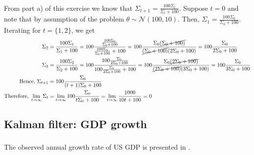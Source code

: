 \documentclass[]{article}
\begin{document}
\subsubsection{}\label{1.3}

From part a) of this exercise we know that $\Sigma_{t+1} = \frac{100\Sigma_t}{\Sigma_t + 100}$. Suppose $t = 0$ and note that by assumption of the problem $\theta\sim\mathcal{N}(100, 10)$. Then, $\Sigma_{1} = \frac{100\Sigma_0}{\Sigma_0 + 100}$. Iterating for $t=\{1, 2\}$, we get
\begin{equation}
\begin{split}
	\Sigma_{2}& = \frac{100\Sigma_1}{\Sigma_1 + 100} = 100\frac{\frac{100\Sigma_0}{\Sigma_0 + 100}}{\frac{100\Sigma_0}{\Sigma_0 + 100} + 100} = 100\frac{\Sigma_0\cancel{(\Sigma_0 + 100)}}{\cancel{(\Sigma_0 + 100)}(2\Sigma_0 + 100)} = 100\frac{\Sigma_0}{2\Sigma_0 + 100}\\\nonumber
	\Sigma_{3}& = \frac{100\Sigma_2}{\Sigma_2 + 100} = 100\frac{100\frac{\Sigma_0}{2\Sigma_0 + 100}}{100\frac{\Sigma_0}{2\Sigma_0 + 100} + 100} = 100\frac{\Sigma_0\cancel{(2\Sigma_0 + 100)}}{\cancel{(2\Sigma_0 + 100)}(3\Sigma_0 + 100)} = 100\frac{\Sigma_0}{3\Sigma_0 + 100} \\
	\text{Hence, }\Sigma_{t+1}& = 100\frac{\Sigma_0}{(t+1)\Sigma_0 + 100}\\
	\text{Therefore, }\lim\limits_{t\to\infty}\Sigma_t& = \lim\limits_{t\to\infty}100\frac{\Sigma_0}{t\Sigma_0 + 100} = \lim\limits_{t\to\infty}\frac{1000}{10t + 100} = 0
\end{split}
\end{equation}

\subsection{Kalman filter: GDP growth}
\subsubsection{}

The observed annual growth rate of US GDP is presented in .

\subsubsection{}
	
\end{document}
